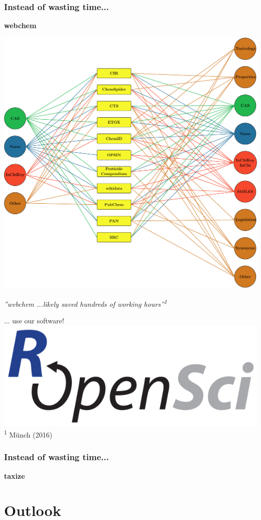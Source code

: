 \documentclass[12pt, t, draft]{beamer}
\begin{document}
\begin{frame}
\frametitle{Instead of wasting time...}


\textbf{\textcolor{hilight}{webchem}}

\begin{center}
\includegraphics[width =.4\textwidth]{fig/fig1.pdf} \\
\end{center}

\pause
\emph{''webchem ...likely saved hundreds of working hours''\textsuperscript{1}}

\textcolor{hilight}{... use our software!}\\

\includegraphics{fig/ropensci.png} \hfill 
\tiny \textsuperscript{1} Münch (2016)

\end{frame}



\begin{frame}
\frametitle{Instead of wasting time...}


\textbf{\textcolor{hilight}{taxize}}



\end{frame}



\section{Outlook}
\end{document}
